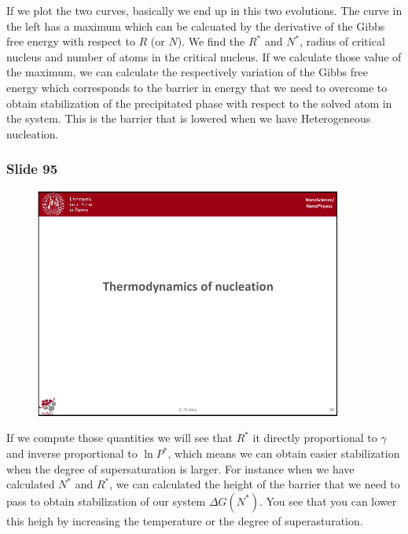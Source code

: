 \documentclass[../main/main.tex]{subfiles}
\begin{document}
If we plot the two curves, basically we end up in this two evolutions. The curve in the left has a maximum which can be calcuated by the derivative of the Gibbs free energy with respect to \( R \) (or \( N \)). We find the \( R^* \) and \( N^* \), radius of critical nucleus and number of atoms in the critical nucleus.
If we calculate those value of the maximum, we can calculate the respectively variation of the Gibbs free energy which corresponds to the barrier in energy that we need to overcome to obtain stabilization of the precipitated phase with respect to the solved atom in the system.
This is the barrier that is lowered when we have Heterogeneous nucleation.


\newpage
\subsubsection{Slide 95}

\begin{figure}[h!]
\centering
\includegraphics[page=6,width=0.9\textwidth]{../lessons/pdf_file/6_lesson.pdf}
\end{figure}


If we compute those quantities we will see that \( R^* \) it directly proportional to \( \gamma   \) and inverse proportional to \( \ln{ P^*} \), which means we can obtain easier stabilization when the degree of supersaturation is larger.
For instance when we have calculated \( N^* \) and \( R^* \), we can calculated the height of the barrier that we need to pass to obtain stabilization of our system \( \Delta G (N^*) \). You see that you can lower this heigh by increasing the temperature or the degree of superasturation.
\end{document}

